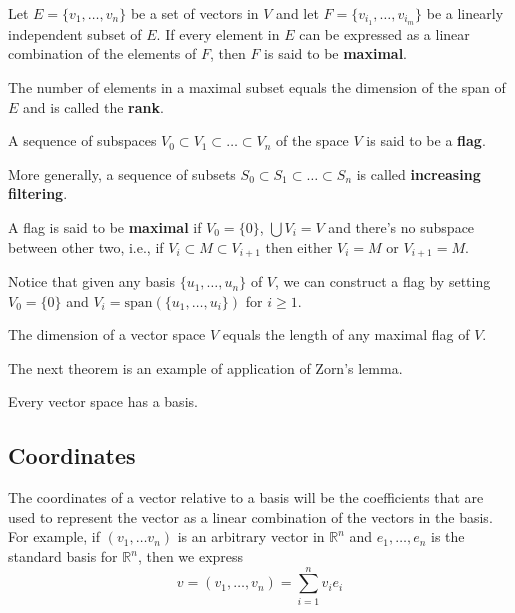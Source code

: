 \begin{definition}[Maximal]
	Let $E = \{ v_1, \ldots, v_n \}$ be a set of vectors in $V$ and let $F = \{ v_{i_1}, \ldots, v_{i_m} \}$ be a linearly independent subset of $E$. If every element in $E$ can be expressed as a linear combination of the elements of $F$, then $F$ is said to be \textbf{maximal}.
\end{definition}

The number of elements in a maximal subset equals the dimension of the span of $E$ and is called the \textbf{rank}.

\begin{definition}[Flags]
	A sequence of subspaces $V_0 \subset V_1 \subset \ldots \subset V_n$ of the space $V$ is said to be a \textbf{flag}.

	More generally, a sequence of subsets $S_0 \subset S_1 \subset \ldots \subset S_n$ is called \textbf{increasing filtering}.

	A flag is said to be \textbf{maximal} if $V_0 = \{ 0 \}$, $\bigcup V_i = V$ and there's no subspace between other two, i.e., if $V_i \subset M \subset V_{i+1}$ then either $V_i = M$ or $V_{i+1} = M$. 
\end{definition}

Notice that given any basis $\{ u_1, \ldots, u_n \}$ of $V$, we can construct a flag by setting $V_0 = \{ 0 \}$ and $V_i = \text{span}(\{ u_1, \ldots, u_i \})$ for $i \geq 1$.

\begin{theorem}
	The dimension of a vector space $V$ equals the length of any maximal flag of $V$.
\end{theorem}

The next theorem is an example of application of Zorn's lemma.

\begin{theorem}
	Every vector space has a basis.
\end{theorem}

\subsection{Coordinates}

The coordinates of a vector relative to a basis will be the coefficients that are used to represent the vector as a linear combination of the vectors in the basis. For example, if $(v_1, \ldots v_n)$ is an arbitrary vector in $\mathbb{R}^n$ and $e_1, \ldots, e_n$ is the standard basis for $\mathbb{R}^n$, then we express
\[
	v = (v_1, \ldots, v_n) = \sum_{i=1}^n v_i e_i
\]

